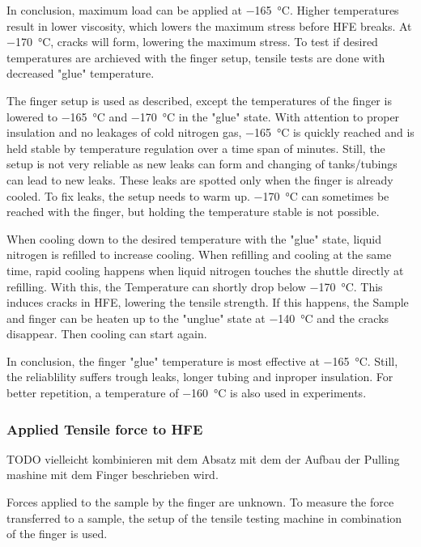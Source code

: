 In conclusion, maximum load can be applied at \SI{-165}{\degreeCelsius}. Higher temperatures result in lower viscosity, which lowers the maximum stress before HFE breaks. At \SI{-170}{\degreeCelsius}, cracks will form, lowering the maximum stress. To test if desired temperatures are archieved with the finger setup, tensile tests are done with decreased "glue" temperature.

The finger setup is used as described, except the temperatures of the finger is lowered to \SI{-165}{\degreeCelsius} and \SI{-170}{\degreeCelsius} in the "glue" state. With attention to proper insulation and no leakages of cold nitrogen gas, \SI{-165}{\degreeCelsius} is quickly reached and is held stable by temperature regulation over a time span of minutes. Still, the setup is not very reliable as new leaks can form and changing of tanks/tubings can lead to new leaks. These leaks are spotted only when the finger is already cooled. To fix leaks, the setup needs to warm up. \SI{-170}{\degreeCelsius} can sometimes be reached with the finger, but holding the temperature stable is not possible. 

When cooling down to the desired temperature with the "glue" state, liquid nitrogen is refilled to increase cooling. When refilling and cooling at the same time, rapid cooling happens when liquid nitrogen touches the shuttle directly at refilling. With this, the Temperature can shortly drop below \SI{-170}{\degreeCelsius}. This induces cracks in HFE, lowering the tensile strength. If this happens, the Sample and finger can be heaten up to the "unglue" state at \SI{-140}{\degreeCelsius} and the cracks disappear. Then cooling can start again.

In conclusion, the finger "glue" temperature is most effective at \SI{-165}{\degreeCelsius}. Still, the reliablility suffers trough leaks, longer tubing and inproper insulation. For better repetition, a temperature of \SI{-160}{\degreeCelsius} is also used in experiments.

\subsubsection{Applied Tensile force to HFE}

TODO vielleicht kombinieren mit dem Absatz mit dem der Aufbau der Pulling mashine mit dem Finger beschrieben wird.

Forces applied to the sample by the finger are unknown. To measure the force transferred to a sample, the setup of the tensile testing machine in combination of the finger is used.

